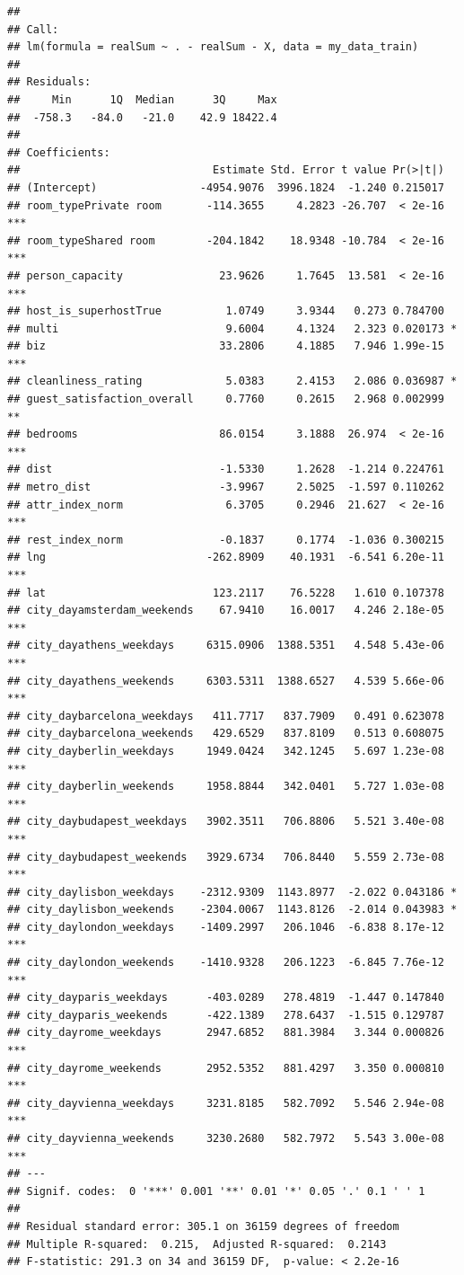 \documentclass[
]{article}
\begin{document}
\begin{verbatim}
## 
## Call:
## lm(formula = realSum ~ . - realSum - X, data = my_data_train)
## 
## Residuals:
##     Min      1Q  Median      3Q     Max 
##  -758.3   -84.0   -21.0    42.9 18422.4 
## 
## Coefficients:
##                              Estimate Std. Error t value Pr(>|t|)    
## (Intercept)                -4954.9076  3996.1824  -1.240 0.215017    
## room_typePrivate room       -114.3655     4.2823 -26.707  < 2e-16 ***
## room_typeShared room        -204.1842    18.9348 -10.784  < 2e-16 ***
## person_capacity               23.9626     1.7645  13.581  < 2e-16 ***
## host_is_superhostTrue          1.0749     3.9344   0.273 0.784700    
## multi                          9.6004     4.1324   2.323 0.020173 *  
## biz                           33.2806     4.1885   7.946 1.99e-15 ***
## cleanliness_rating             5.0383     2.4153   2.086 0.036987 *  
## guest_satisfaction_overall     0.7760     0.2615   2.968 0.002999 ** 
## bedrooms                      86.0154     3.1888  26.974  < 2e-16 ***
## dist                          -1.5330     1.2628  -1.214 0.224761    
## metro_dist                    -3.9967     2.5025  -1.597 0.110262    
## attr_index_norm                6.3705     0.2946  21.627  < 2e-16 ***
## rest_index_norm               -0.1837     0.1774  -1.036 0.300215    
## lng                         -262.8909    40.1931  -6.541 6.20e-11 ***
## lat                          123.2117    76.5228   1.610 0.107378    
## city_dayamsterdam_weekends    67.9410    16.0017   4.246 2.18e-05 ***
## city_dayathens_weekdays     6315.0906  1388.5351   4.548 5.43e-06 ***
## city_dayathens_weekends     6303.5311  1388.6527   4.539 5.66e-06 ***
## city_daybarcelona_weekdays   411.7717   837.7909   0.491 0.623078    
## city_daybarcelona_weekends   429.6529   837.8109   0.513 0.608075    
## city_dayberlin_weekdays     1949.0424   342.1245   5.697 1.23e-08 ***
## city_dayberlin_weekends     1958.8844   342.0401   5.727 1.03e-08 ***
## city_daybudapest_weekdays   3902.3511   706.8806   5.521 3.40e-08 ***
## city_daybudapest_weekends   3929.6734   706.8440   5.559 2.73e-08 ***
## city_daylisbon_weekdays    -2312.9309  1143.8977  -2.022 0.043186 *  
## city_daylisbon_weekends    -2304.0067  1143.8126  -2.014 0.043983 *  
## city_daylondon_weekdays    -1409.2997   206.1046  -6.838 8.17e-12 ***
## city_daylondon_weekends    -1410.9328   206.1223  -6.845 7.76e-12 ***
## city_dayparis_weekdays      -403.0289   278.4819  -1.447 0.147840    
## city_dayparis_weekends      -422.1389   278.6437  -1.515 0.129787    
## city_dayrome_weekdays       2947.6852   881.3984   3.344 0.000826 ***
## city_dayrome_weekends       2952.5352   881.4297   3.350 0.000810 ***
## city_dayvienna_weekdays     3231.8185   582.7092   5.546 2.94e-08 ***
## city_dayvienna_weekends     3230.2680   582.7972   5.543 3.00e-08 ***
## ---
## Signif. codes:  0 '***' 0.001 '**' 0.01 '*' 0.05 '.' 0.1 ' ' 1
## 
## Residual standard error: 305.1 on 36159 degrees of freedom
## Multiple R-squared:  0.215,  Adjusted R-squared:  0.2143 
## F-statistic: 291.3 on 34 and 36159 DF,  p-value: < 2.2e-16
\end{verbatim}
\end{document}

